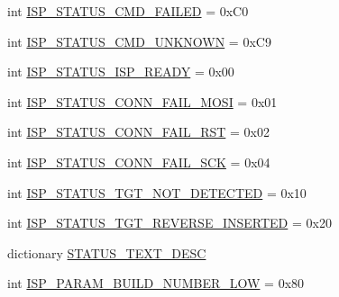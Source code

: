 \begin{DoxyCompactItemize}
\item 
int \hyperlink{classsoftware_1_1chipwhisperer_1_1hardware_1_1naeusb_1_1programmer__avr_1_1AVRISP_ad00cf4940f4b99fc1bcd362d20d764a5}{I\+S\+P\+\_\+\+S\+T\+A\+T\+U\+S\+\_\+\+C\+M\+D\+\_\+\+F\+A\+I\+L\+E\+D} = 0x\+C0
\item 
int \hyperlink{classsoftware_1_1chipwhisperer_1_1hardware_1_1naeusb_1_1programmer__avr_1_1AVRISP_a85eeefe825018a0cbe31e1091bdc3278}{I\+S\+P\+\_\+\+S\+T\+A\+T\+U\+S\+\_\+\+C\+M\+D\+\_\+\+U\+N\+K\+N\+O\+W\+N} = 0x\+C9
\item 
int \hyperlink{classsoftware_1_1chipwhisperer_1_1hardware_1_1naeusb_1_1programmer__avr_1_1AVRISP_ae9774e154bb532e0313a3789baa21f3f}{I\+S\+P\+\_\+\+S\+T\+A\+T\+U\+S\+\_\+\+I\+S\+P\+\_\+\+R\+E\+A\+D\+Y} = 0x00
\item 
int \hyperlink{classsoftware_1_1chipwhisperer_1_1hardware_1_1naeusb_1_1programmer__avr_1_1AVRISP_aa58bfd3159837fd5bd34fec480e4e61f}{I\+S\+P\+\_\+\+S\+T\+A\+T\+U\+S\+\_\+\+C\+O\+N\+N\+\_\+\+F\+A\+I\+L\+\_\+\+M\+O\+S\+I} = 0x01
\item 
int \hyperlink{classsoftware_1_1chipwhisperer_1_1hardware_1_1naeusb_1_1programmer__avr_1_1AVRISP_a8a1050270f3a4d3d9c6198ee9a1c16ea}{I\+S\+P\+\_\+\+S\+T\+A\+T\+U\+S\+\_\+\+C\+O\+N\+N\+\_\+\+F\+A\+I\+L\+\_\+\+R\+S\+T} = 0x02
\item 
int \hyperlink{classsoftware_1_1chipwhisperer_1_1hardware_1_1naeusb_1_1programmer__avr_1_1AVRISP_a726b1548c93bba2f2ffd1e38a74aa606}{I\+S\+P\+\_\+\+S\+T\+A\+T\+U\+S\+\_\+\+C\+O\+N\+N\+\_\+\+F\+A\+I\+L\+\_\+\+S\+C\+K} = 0x04
\item 
int \hyperlink{classsoftware_1_1chipwhisperer_1_1hardware_1_1naeusb_1_1programmer__avr_1_1AVRISP_ad77172e8691de3d28d3a04758558d01b}{I\+S\+P\+\_\+\+S\+T\+A\+T\+U\+S\+\_\+\+T\+G\+T\+\_\+\+N\+O\+T\+\_\+\+D\+E\+T\+E\+C\+T\+E\+D} = 0x10
\item 
int \hyperlink{classsoftware_1_1chipwhisperer_1_1hardware_1_1naeusb_1_1programmer__avr_1_1AVRISP_aa4c9c0155268529b4e7a9cf75d453f21}{I\+S\+P\+\_\+\+S\+T\+A\+T\+U\+S\+\_\+\+T\+G\+T\+\_\+\+R\+E\+V\+E\+R\+S\+E\+\_\+\+I\+N\+S\+E\+R\+T\+E\+D} = 0x20
\item 
dictionary \hyperlink{classsoftware_1_1chipwhisperer_1_1hardware_1_1naeusb_1_1programmer__avr_1_1AVRISP_ab2178dc6b2bc0b67b2b306f35934c517}{S\+T\+A\+T\+U\+S\+\_\+\+T\+E\+X\+T\+\_\+\+D\+E\+S\+C}
\item 
int \hyperlink{classsoftware_1_1chipwhisperer_1_1hardware_1_1naeusb_1_1programmer__avr_1_1AVRISP_ab49c377c6dc37d7ce2174257854c8924}{I\+S\+P\+\_\+\+P\+A\+R\+A\+M\+\_\+\+B\+U\+I\+L\+D\+\_\+\+N\+U\+M\+B\+E\+R\+\_\+\+L\+O\+W} = 0x80

\end{DoxyCompactItemize}
